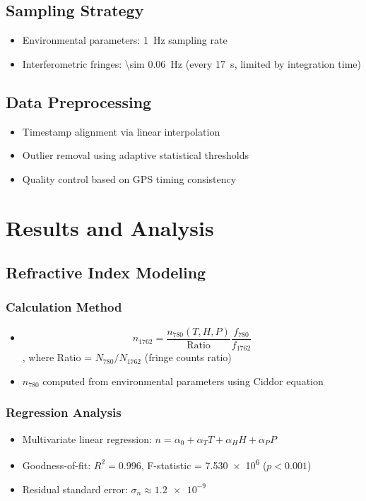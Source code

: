 \documentclass[aps,prl,reprint,groupedaddress,onecolumn,superscriptaddress]{revtex4-2}
\begin{document}
\subsection{Sampling Strategy}
\begin{itemize}
    \item Environmental parameters: \SI{1}{\hertz} sampling rate
    \item Interferometric fringes: \SI{\sim 0.06}{\hertz} (every \SI{17}{\second}, limited by integration time)
\end{itemize}

\subsection{Data Preprocessing}
\begin{itemize}
    \item Timestamp alignment via linear interpolation
    \item Outlier removal using adaptive statistical thresholds
    \item Quality control based on GPS timing consistency
\end{itemize}

\section{Results and Analysis}

\subsection{Refractive Index Modeling}

\subsubsection{Calculation Method}
\begin{itemize}
    \item $$n_{1762} = \frac{n_{780}(T,H,P)}{\text{Ratio}} \frac{f_{780}}{f_{1762}}$$, where Ratio = $N_{780}/N_{1762}$ (fringe counts ratio)
    \item $n_{780}$ computed from environmental parameters using Ciddor equation \cite{ciddor1996refractive}
\end{itemize}

\subsubsection{Regression Analysis}
\begin{itemize}
    \item Multivariate linear regression: $n = \alpha_0 + \alpha_T T + \alpha_H H + \alpha_P P$
    \item Goodness-of-fit: $R^2 = \num{0.996}$, F-statistic = \num{7.530e6} ($p < \num{0.001}$)
    \item Residual standard error: $\sigma_n \approx \num{1.2e-9}$
\end{itemize}
\end{document}
